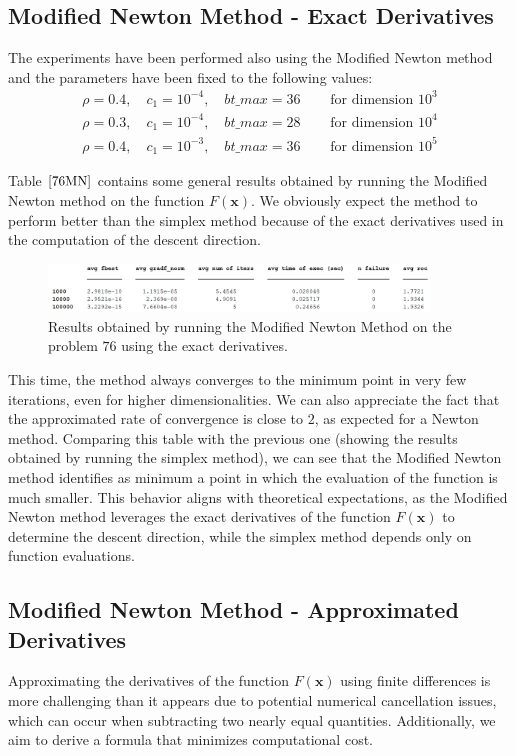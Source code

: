 \medskip
\subsection*{Modified Newton Method - Exact Derivatives}
The experiments have been performed also using the Modified Newton method and the parameters have been fixed to the following values:
\begin{align*}
    \rho =  0.4, \quad c_1 = 10^{-4}, \quad bt\_max = 36 \quad &\text{ for dimension } 10^3 \\
    \rho =  0.3, \quad c_1 = 10^{-4}, \quad bt\_max = 28 \quad &\text{ for dimension } 10^4 \\
    \rho =  0.4, \quad c_1 = 10^{-3}, \quad bt\_max = 36 \quad &\text{ for dimension } 10^5 
\end{align*}

Table $\eqref{76MN}$ contains some general results obtained by running the Modified Newton method on the function $F(\mathbf{x})$.
We obviously expect the method to perform better than the simplex method because of the exact derivatives used in the computation of the descent direction.

\begin{figure}[htbp]
    \centering
    \includegraphics[width = 0.9\textwidth]{img/pb76_table_MN.png}
    \caption{Results obtained by running the Modified Newton Method on the problem $76$ using the exact derivatives.}
    \label{76MN}
\end{figure}

This time, the method always converges to the minimum point in very few iterations, even for higher dimensionalities. 
We can also appreciate the fact that the approximated rate of convergence is close to $2$, as expected for a Newton method.
Comparing this table with the previous one (showing the results obtained by running the simplex method), we can see that the Modified Newton method identifies as minimum a point in which the evaluation of the function is much smaller. 
This behavior aligns with theoretical expectations, as the Modified Newton method leverages the exact derivatives of the function $F(\mathbf{x})$ to determine the descent direction, while the simplex method depends only on function evaluations.

\medskip
\subsection*{Modified Newton Method - Approximated Derivatives}
Approximating the derivatives of the function $F(\mathbf{x})$ using finite differences is more challenging than it appears due to potential numerical cancellation issues, which can occur when subtracting two nearly equal quantities. Additionally, we aim to derive a formula that minimizes computational cost.

